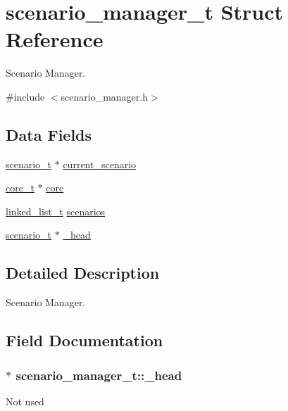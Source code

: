 \hypertarget{structscenario__manager__t}{}\section{scenario\+\_\+manager\+\_\+t Struct Reference}
\label{structscenario__manager__t}


Scenario Manager.  




{\ttfamily \#include $<$scenario\+\_\+manager.\+h$>$}

\subsection*{Data Fields}
\begin{DoxyCompactItemize}
\item 
\hyperlink{structscenario__t}{scenario\+\_\+t} $\ast$ \hyperlink{structscenario__manager__t_aa74df73bef016afb248a2c2df004bc8e}{current\+\_\+scenario}
\item 
\hyperlink{structcore__t}{core\+\_\+t} $\ast$ \hyperlink{structscenario__manager__t_a4fff49d96cbc989dad6aea0594165a5d}{core}
\item 
\hyperlink{structlinked__list__t}{linked\+\_\+list\+\_\+t} \hyperlink{structscenario__manager__t_a3143c7412ad621c612faf9549b2826ad}{scenarios}
\item 
\hyperlink{structscenario__t}{scenario\+\_\+t} $\ast$ \hyperlink{structscenario__manager__t_ad359cd8fa8497fcd1cf96c5b549cb947}{\+\_\+head}
\end{DoxyCompactItemize}


\subsection{Detailed Description}
Scenario Manager. 

\subsection{Field Documentation}
\subsubsection[{\texorpdfstring{\+\_\+head}{\_head}}]{$\ast$ scenario\+\_\+manager\+\_\+t\+::\+\_\+head}\hypertarget{structscenario__manager__t_ad359cd8fa8497fcd1cf96c5b549cb947}{}\label{structscenario__manager__t_ad359cd8fa8497fcd1cf96c5b549cb947}
Not used 
